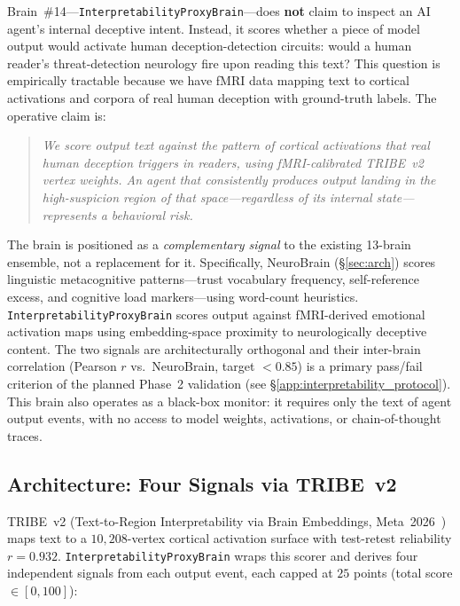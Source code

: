 \documentclass{article}
\begin{document}
Brain~\#14---\texttt{InterpretabilityProxyBrain}---does \textbf{not}
claim to inspect an AI agent's internal deceptive intent. Instead, it
scores whether a piece of model output would activate human
deception-detection circuits: would a human reader's threat-detection
neurology fire upon reading this text? This question is empirically
tractable because we have fMRI data mapping text to cortical
activations and corpora of real human deception with ground-truth
labels. The operative claim is:

\begin{quote}
\emph{We score output text against the pattern of cortical activations
that real human deception triggers in readers, using fMRI-calibrated
TRIBE~v2 vertex weights. An agent that consistently produces output
landing in the high-suspicion region of that space---regardless of its
internal state---represents a behavioral risk.}
\end{quote}

The brain is positioned as a \emph{complementary signal} to the
existing 13-brain ensemble, not a replacement for it. Specifically,
NeuroBrain (\S\ref{sec:arch}) scores linguistic metacognitive
patterns---trust vocabulary frequency, self-reference excess, and
cognitive load markers---using word-count heuristics.
\texttt{InterpretabilityProxyBrain} scores output against fMRI-derived
emotional activation maps using embedding-space proximity to
neurologically deceptive content. The two signals are architecturally
orthogonal and their inter-brain correlation (Pearson $r$ vs.\
NeuroBrain, target $< 0.85$) is a primary pass/fail criterion of the
planned Phase~2 validation (see \S\ref{app:interpretability_protocol}). This
brain also operates as a black-box monitor: it requires only the text
of agent output events, with no access to model weights, activations,
or chain-of-thought traces.

\subsection{Architecture: Four Signals via TRIBE~v2}

TRIBE~v2 (Text-to-Region Interpretability via Brain Embeddings,
Meta~2026~\cite{tribev2meta2026}) maps text to a $10{,}208$-vertex
cortical activation surface with test-retest reliability $r = 0.932$.
\texttt{InterpretabilityProxyBrain} wraps this scorer and derives four
independent signals from each output event, each capped at $25$
points (total score $\in [0, 100]$):
\end{document}
